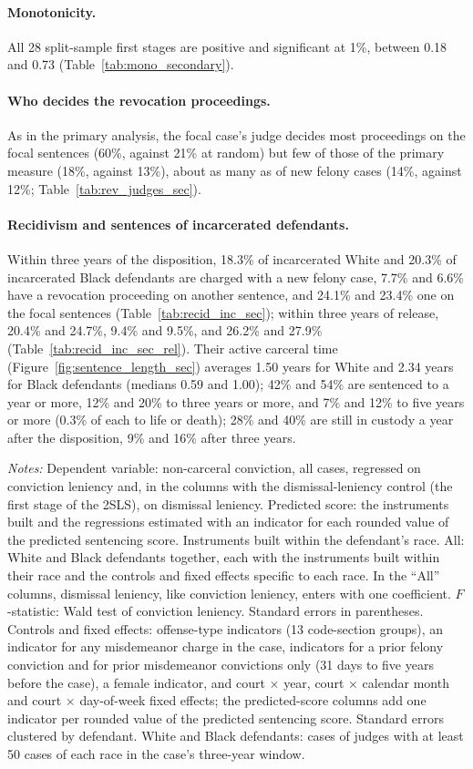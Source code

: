 \documentclass[11pt]{article}
\newcommand{\tabnote}[1]{\par\vspace{0.6ex}\begin{minipage}{\linewidth}\linespread{1}\footnotesize\textit{Notes:} #1\end{minipage}}
\newcommand{\controlsnote}{offense-type indicators (13 code-section groups), an indicator for any misdemeanor charge in the case, indicators for a prior felony conviction and for prior misdemeanor convictions only (31 days to five years before the case), a female indicator, and court $\times$ year, court $\times$ calendar month and court $\times$ day-of-week fixed effects}
\newcommand{\specnotesec}{Controls and fixed effects: \controlsnote; the predicted-score columns add one indicator per rounded value of the predicted sentencing score. Standard errors clustered by defendant.}
\newcommand{\racesamplenote}{White and Black defendants: cases of judges with at least 50 cases of each race in the case's three-year window.}
\newcommand{\allnote}{All: White and Black defendants together, each with the instruments built within their race and the controls and fixed effects specific to each race.}
\begin{document}
\paragraph{Monotonicity.} All 28 split-sample first stages are positive and significant at 1\%, between 0.18 and 0.73 (Table~\ref{tab:mono_secondary}).

\paragraph{Who decides the revocation proceedings.} As in the primary analysis, the focal case's judge decides most proceedings on the focal sentences (60\%, against 21\% at random) but few of those of the primary measure (18\%, against 13\%), about as many as of new felony cases (14\%, against 12\%; Table~\ref{tab:rev_judges_sec}).

\paragraph{Recidivism and sentences of incarcerated defendants.} Within three years of the disposition, 18.3\% of incarcerated White and 20.3\% of incarcerated Black defendants are charged with a new felony case, 7.7\% and 6.6\% have a revocation proceeding on another sentence, and 24.1\% and 23.4\% one on the focal sentences (Table~\ref{tab:recid_inc_sec}); within three years of release, 20.4\% and 24.7\%, 9.4\% and 9.5\%, and 26.2\% and 27.9\% (Table~\ref{tab:recid_inc_sec_rel}). Their active carceral time (Figure~\ref{fig:sentence_length_sec}) averages 1.50 years for White and 2.34 years for Black defendants (medians 0.59 and 1.00); 42\% and 54\% are sentenced to a year or more, 12\% and 20\% to three years or more, and 7\% and 12\% to five years or more (0.3\% of each to life or death); 28\% and 40\% are still in custody a year after the disposition, 9\% and 16\% after three years.

\begin{table}[H]
\centering
\caption{First stages: non-carceral conviction, secondary analysis}\label{tab:fs_secondary}
\resizebox{\textwidth}{!}{}
\tabnote{Dependent variable: non-carceral conviction, all cases, regressed on conviction leniency and, in the columns with the dismissal-leniency control (the first stage of the 2SLS), on dismissal leniency. Predicted score: the instruments built and the regressions estimated with an indicator for each rounded value of the predicted sentencing score. Instruments built within the defendant's race. \allnote{} In the ``All'' columns, dismissal leniency, like conviction leniency, enters with one coefficient. $F$-statistic: Wald test of conviction leniency. Standard errors in parentheses. \specnotesec{} \racesamplenote}
\end{table}
\end{document}
